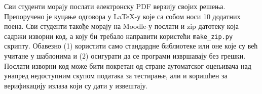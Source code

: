 Сви студенти морају послати електронску PDF верзију својих решења. Препоручено је куцање одговора у \LaTeX-у које са собом носи 10 додатних поена. Сви студенти такође морају на Moodle-у послати и zip датотеку која садржи изворни код, а коју би требало направити користећи \texttt{make\_zip.py} скрипту. Обавезно (1) користити само стандардне библиотеке или оне које су већ учитане у шаблонима и (2) осигурати да се програми извршавају без грешки. Послати изворни код може бити покретан од стране аутоматског оцењивача над унапред недоступним скупом података за тестирање, али и коришћен за верификацију излаза који су дати у извештају.

